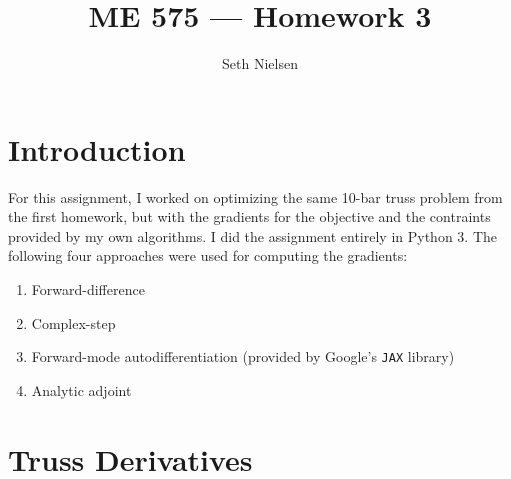\documentclass{article}
\begin{document}
\title{ME 575 --- Homework 3}
\author{Seth Nielsen}
\date{}
\maketitle

\section*{Introduction}

For this assignment, I worked on optimizing the same 10-bar truss problem from the first homework, but with the gradients for the objective and the contraints provided by my own algorithms. I did the assignment entirely in Python 3. The following four approaches were used for computing the gradients:

\begin{enumerate}
	\item Forward-difference
	\item Complex-step
	\item Forward-mode autodifferentiation (provided by Google's \texttt{JAX} library)
	\item Analytic adjoint
\end{enumerate}

\section{Truss Derivatives}
\end{document}
